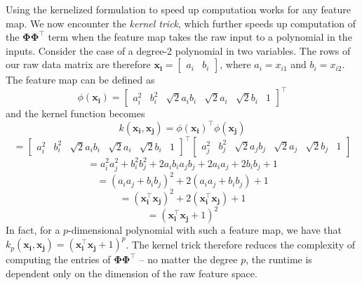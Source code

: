 \documentclass{article}
\begin{document}
Using the kernelized formulation to speed up computation works for any feature map. We now encounter the \textit{kernel trick}, which further speeds up computation of the $\mathbf{\Phi\Phi^{\top}}$ term when the feature map takes the raw input to a polynomial in the inputs. Consider the case of a degree-2 polynomial in two variables. The rows of our raw data matrix are therefore $\mathbf{x_i} = \begin{bmatrix} a_i & b_i \end{bmatrix}$, where $a_i = x_{i1}$ and $b_i = x_{i2}$. The feature map can be defined as $$\phi(\mathbf{x_i}) = \begin{bmatrix} a_i^2 & b_i^2 & \sqrt{2}a_ib_i & \sqrt{2}a_i & \sqrt{2}b_i & 1 \end{bmatrix}^{\top}$$ and the kernel function becomes $$k(\mathbf{x_i, x_j}) = \phi(\mathbf{x_i})^{\top}\phi(\mathbf{x_j})$$ $$= \begin{bmatrix} a_i^2 & b_i^2 & \sqrt{2}a_ib_i & \sqrt{2}a_i & \sqrt{2}b_i & 1 \end{bmatrix}^{\top}\begin{bmatrix} a_j^2 & b_j^2 & \sqrt{2}a_jb_j & \sqrt{2}a_j & \sqrt{2}b_j & 1 \end{bmatrix}$$ $$ = a_i^2a_j^2 + b_i^2b_j^2 + 2a_ib_ia_jb_j + 2a_ia_j + 2 b_ib_j + 1$$ $$ =(a_ia_j + b_ib_j)^2 + 2(a_ia_j + b_ib_j) + 1$$ $$=(\mathbf{x_i^{\top}x_j})^2 + 2(\mathbf{x_i^{\top}x_j}) + 1$$ $$=(\mathbf{x_i^{\top}x_j} + 1)^2$$ In fact, for a $p$-dimensional polynomial with such a feature map, we have that $k_p(\mathbf{x_i, x_j}) = (\mathbf{x_i^{\top}x_j} + 1)^p$. The kernel trick therefore reduces the complexity of computing the entries of $\mathbf{\Phi\Phi^{\top}}$ -- no matter the degree $p$, the runtime is dependent only on the dimension of the raw feature space.

\clearpage
\end{document}
